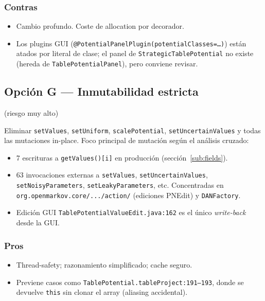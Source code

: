 \documentclass[11pt,a4paper]{article}
\newcommand{\code}[1]{\texttt{#1}}
\begin{document}
\subsubsection*{Contras}
\begin{itemize}[leftmargin=*]
  \item Cambio profundo. Coste de allocation por decorador.
  \item Los plugins GUI (\code{@PotentialPanelPlugin(potentialClasses=\dots)})
        están atados por literal de clase; el panel de
        \code{StrategicTablePotential} no existe (hereda de
        \code{TablePotentialPanel}), pero conviene revisar.
\end{itemize}

\subsection{Opción G --- Inmutabilidad estricta} (riesgo muy alto)

Eliminar \code{setValues}, \code{setUniform}, \code{scalePotential},
\code{setUncertainValues} y todas las mutaciones in-place. Foco principal de
mutación según el análisis cruzado:

\begin{itemize}[leftmargin=*]
  \item 7 escrituras a \code{getValues()[i]} en producción
        (sección~\ref{sub:fields}).
  \item 63 invocaciones externas a \code{setValues}, \code{setUncertainValues},
        \code{setNoisyParameters}, \code{setLeakyParameters}, etc. Concentradas
        en \code{org.openmarkov.core/.../action/} (ediciones PNEdit) y
        \code{DANFactory}.
  \item Edición GUI \code{TablePotentialValueEdit.java:162} es el único
        \emph{write-back} desde la GUI.
\end{itemize}

\subsubsection*{Pros}
\begin{itemize}[leftmargin=*]
  \item Thread-safety; razonamiento simplificado; cache seguro.
  \item Previene casos como
        \code{TablePotential.tableProject:191--193}, donde se devuelve
        \code{this} sin clonar el array (aliasing accidental).
\end{itemize}
\end{document}
